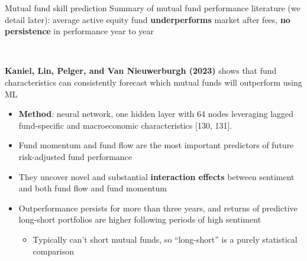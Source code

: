 \documentclass[xcolor=table, aspectratio=169]{beamer}
\newcommand{\alertbf}[1]{\alert{\textbf{#1}}}
\begin{document}
\begin{frame}{Mutual fund skill prediction}
Summary of mutual fund performance literature (we detail later): average active equity fund \alertbf{underperforms} market after fees, \alertbf{no persistence} in performance year to year

~

\alertbf{Kaniel, Lin, Pelger, and Van Nieuwerburgh (2023)} shows that fund characteristics can consistently forecast which mutual funds will outperform using ML
    \begin{itemize}
        \item \alertbf{Method}: neural network, one hidden layer with 64 nodes
        leveraging lagged fund-specific and macroeconomic characteristics [130, 131].
        \item Fund momentum and fund flow are the most important predictors of future risk-adjusted fund performance
        \item They uncover novel and substantial \alertbf{interaction effects} between sentiment and both fund flow and fund momentum
        \item Outperformance persists for more than three years, and returns of predictive long-short portfolios are higher following periods of high sentiment
        \begin{itemize}
            \item Typically can't short mutual funds, so ``long-short'' is a purely statistical comparison
        \end{itemize}
    \end{itemize}
\end{frame}
\end{document}
